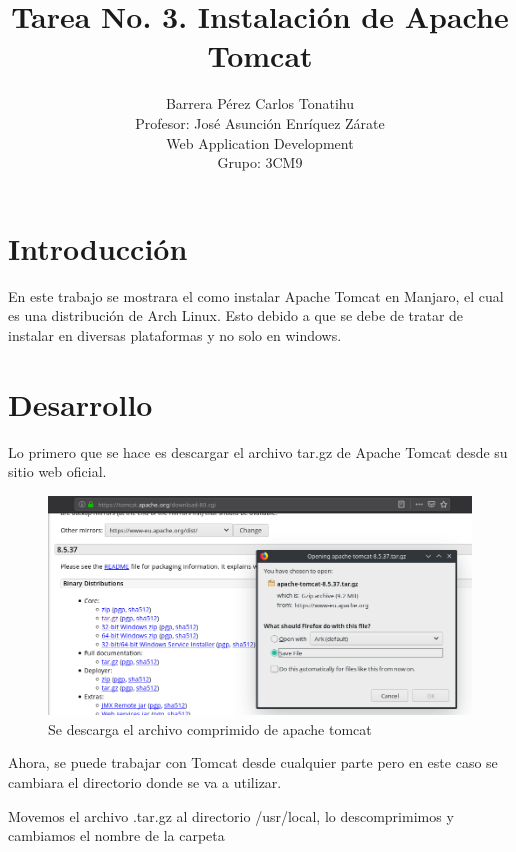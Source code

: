 \documentclass[a4paper,12pt]{article}
\title{Tarea No. 3. Instalación de Apache Tomcat}
\author{Barrera Pérez Carlos Tonatihu \\ Profesor: José Asunción Enríquez 
Zárate 
\\ Web Application Development \\ Grupo: 3CM9 }
\begin{document}
\maketitle
\newpage
\tableofcontents

\newpage
\section{Introducción}
En este trabajo se mostrara el como instalar Apache Tomcat en Manjaro, el cual 
es una distribución de Arch Linux. Esto debido a que se debe de tratar de 
instalar en diversas plataformas y no solo en windows.
\section{Desarrollo}
Lo primero que se hace es descargar el archivo tar.gz de Apache Tomcat desde su 
sitio web oficial.

\begin{figure}[H]
\begin{center}
 \includegraphics[width=12cm]{descarga.png}
 \caption{Se descarga el archivo comprimido de apache tomcat}
 \label{fig:descarga}
\end{center}
\end{figure}

Ahora, se puede trabajar con Tomcat desde cualquier parte pero en este caso se 
cambiara el directorio donde se va a utilizar.

Movemos el archivo .tar.gz al directorio /usr/local, lo descomprimimos y 
cambiamos el nombre de la carpeta
\end{document}

